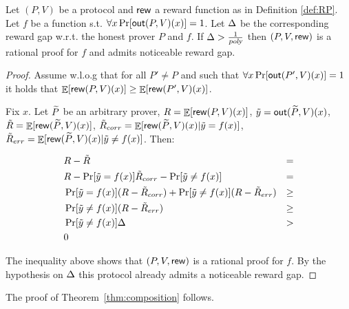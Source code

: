 \begin{lemma}
	\label{lemma:noticeable-gap-implies-rp}
	Let $(P,V)$ be a protocol and $\mathsf{rew}$ a reward function as in Definition \ref{def:RP}.
	Let $f$ be a function s.t. $\forall x \Pr[\mathsf{out}(P,V)(x)] = 1$.
	Let $\Delta$ be the corresponding reward gap w.r.t. the honest prover $P$ and $f$.
	If $\Delta > \frac{1}{{\textsl{poly}}}$ then $(P,V,\mathsf{rew})$ is a rational proof for $f$ and admits noticeable reward gap.
\end{lemma}
\begin{proof}
	Assume w.l.o.g that for all $P' \not = P$ and such that $\forall x \Pr[\mathsf{out}(P',V)(x)] = 1$ it holds that
	$\mathop{\mathbb{E}}[\mathsf{rew}(P,V)(x)] \geq \mathop{\mathbb{E}}[\mathsf{rew}(P',V)(x)]$.
	
	Fix $x$. Let $\widetilde{P}$ be an arbitrary prover, $R = \mathop{\mathbb{E}}[\mathsf{rew}(P,V)(x)] $, $\tilde{y} = \mathsf{out}(\widetilde{P}, V)(x)$, $\tilde{R} = \mathop{\mathbb{E}}[\mathsf{rew}(\widetilde{P},V)(x)]$, $\tilde{R}_{corr} = \mathop{\mathbb{E}}[\mathsf{rew}(\widetilde{P},V)(x) | \tilde{y} = f(x)]$, $\tilde{R}_{err} = \mathop{\mathbb{E}}[\mathsf{rew}(\widetilde{P},V)(x) | \tilde{y} \not = f(x)]$. Then:
	
	\begin{align}
	& R - \tilde{R} & =  \\
	& R - \Pr[\tilde{y} = f(x)]\tilde{R}_{corr} - \Pr[\tilde{y} \not = f(x)] & = \\
	& \Pr[\tilde{y} = f(x)](R-\tilde{R}_{corr}) + \Pr[\tilde{y} \not = f(x)](R-\tilde{R}_{err}) & \geq \\
	& \Pr[\tilde{y} \not = f(x)](R-\tilde{R}_{err}) & \geq \\
	& \Pr[\tilde{y} \not = f(x)]\Delta & > \\
	& 0 
	\end{align}
	
	The inequality above shows that $(P,V, \mathsf{rew})$ is a rational proof for $f$.
	By the hypothesis on $\Delta$ this protocol already admits a noticeable reward gap.
\end{proof}

The proof of Theorem~\ref{thm:composition} follows.

